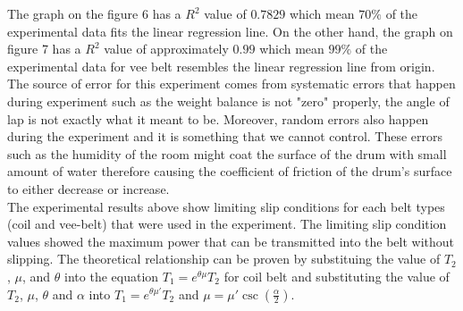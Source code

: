 The graph on the figure 6 has a $R^2$ value of $0.7829$ which mean $70\%$ of the experimental data fits the linear regression line. On the other hand, the graph on figure 7 has a $R^2$ value of approximately $0.99$ which mean $99\%$ of the experimental data for vee belt resembles the linear regression line from origin. The source of error for this experiment comes from systematic errors that happen during experiment such as the weight balance is not "zero" properly, the angle of lap is not exactly what it meant to be. Moreover, random errors also happen during the experiment and it is something that we cannot control. These errors such as the humidity of the room might coat the surface of the drum with small amount of water therefore causing the coefficient of friction of the drum's surface to either decrease or increase. \\

The experimental results above show limiting slip conditions for each belt types (coil and vee-belt) that were used in the experiment. The limiting slip condition values showed the maximum power that can be transmitted into the belt without slipping. The theoretical relationship can be proven by substituing the value of $T_2$, $\mu$, and $\theta$ into the equation $T_1 = e^{\theta \mu}T_2$ for coil belt and substituting the value of  $T_2$, $\mu$, $\theta$ and $\alpha$ into  $T_1 = e^{\theta \mu '}T_2$ and $\mu = \mu ' \csc\left(\frac{\alpha}{2}\right)$.
